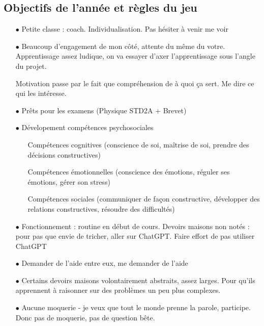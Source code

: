 \documentclass[a4paper,12pt]{article}
\begin{document}
\subsection{Objectifs de l'année et règles du jeu}
\begin{itemize}
  \item[$\bullet$] Petite classe : coach. Individualisation. Pas hésiter à venir me voir
  \item[$\bullet$] Beaucoup d'engagement de mon côté, attente du même du votre. Apprentissage assez ludique, on va essayer d'axer l'apprentissage sous l'angle du projet. \par 
  Motivation passe par le fait que compréhension de à quoi ça sert. Me dire ce qui les intéresse.
  \item[$\bullet$] Prêts pour les examens (Physique STD2A + Brevet)
  \item[$\bullet$] Dévelopement compétences psychosociales
  \begin{itemize}
    \item[] Compétences cognitives (conscience de soi, maîtrise de soi, prendre des décisions constructives)
    \item[] Compétences émotionnelles (conscience des émotions, réguler ses émotions, gérer son stress)
    \item[] Compétences sociales (communiquer de façon constructive, développer des relations constructives, résoudre des difficultés)
  \end{itemize}
  \item[$\bullet$] Fonctionnement : routine en début de cours. Devoirs maisons non notés : pour pas que envie de tricher, aller sur ChatGPT. Faire effort de pas utiliser ChatGPT 
  \item[$\bullet$] Demander de l'aide entre eux, me demander de l'aide
  \item[$\bullet$] Certains devoirs maisons volontairement abstraits, assez larges. Pour qu'ils apprennent à raisonner sur des problèmes un peu plus complexes.
  \item[$\bullet$] Aucune moquerie - je veux que tout le monde prenne la parole, participe. Donc pas de moquerie, pas de question bête.
\end{itemize}
\end{document}
